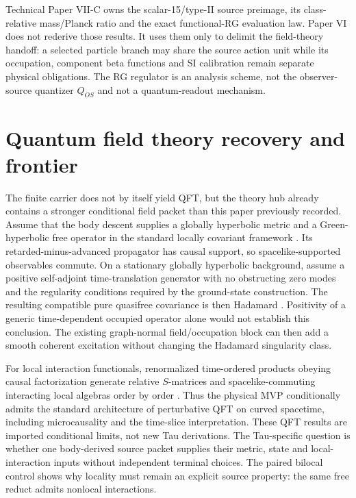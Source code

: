 \documentclass[11pt]{article}
\begin{document}
Technical Paper VII-C owns the scalar-15/type-II source preimage, its
class-relative mass/Planck ratio and the exact functional-RG evaluation law.
Paper VI does not rederive those results. It uses them only to delimit the
field-theory handoff: a selected particle branch may share the source action
unit while its occupation, component beta functions and SI calibration remain
separate physical obligations. The RG regulator is an analysis scheme, not
the observer-source quantizer \(Q_{OS}\) and not a quantum-readout mechanism.

\section{Quantum field theory recovery and frontier}

The finite carrier does not by itself yield QFT, but the theory hub already
contains a stronger conditional field packet than this paper previously
recorded.  Assume that the body descent supplies a globally hyperbolic metric
and a Green-hyperbolic free operator in the standard locally covariant
framework \citep{BrunettiFredenhagenVerch2003}.  Its
retarded-minus-advanced propagator has causal support, so spacelike-supported
observables commute.  On a stationary globally hyperbolic background, assume
a positive self-adjoint time-translation generator with no obstructing zero
modes and the regularity conditions required by the ground-state construction.
The resulting compatible pure quasifree covariance is then Hadamard
\citep{Radzikowski1996}.  Positivity of a generic time-dependent occupied
operator alone would not establish this conclusion.  The existing graph-normal
field/occupation block can then add a smooth coherent excitation without
changing the Hadamard singularity class.

For local interaction functionals, renormalized time-ordered products obeying
causal factorization generate relative $S$-matrices and spacelike-commuting
interacting local algebras order by order
\citep{BrunettiFredenhagen2000,HollandsWald2001}.  Thus the physical MVP
conditionally admits the standard architecture of perturbative QFT on curved
spacetime, including microcausality and the time-slice interpretation.  These
QFT results are imported conditional limits, not new Tau derivations.  The
Tau-specific question is whether one body-derived source packet supplies their
metric, state and local-interaction inputs without independent terminal
choices.  The paired bilocal control
shows why locality must remain an explicit source property: the same free
reduct admits nonlocal interactions.
\end{document}
